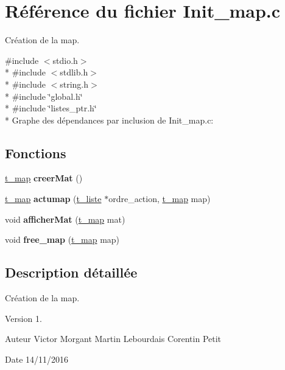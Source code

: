 \hypertarget{a00021}{}\section{Référence du fichier Init\+\_\+map.\+c}
\label{a00021}


Création de la map.  


{\ttfamily \#include $<$stdio.\+h$>$}\\*
{\ttfamily \#include $<$stdlib.\+h$>$}\\*
{\ttfamily \#include $<$string.\+h$>$}\\*
{\ttfamily \#include \char`\"{}global.\+h\char`\"{}}\\*
{\ttfamily \#include \char`\"{}listes\+\_\+ptr.\+h\char`\"{}}\\*
Graphe des dépendances par inclusion de Init\+\_\+map.\+c\+:
\subsection*{Fonctions}
\begin{DoxyCompactItemize}
\item 
\hyperlink{a00006}{t\+\_\+map} {\bfseries creer\+Mat} ()\hypertarget{a00021_aabb31eb0a9fed7b9013e4a396d92d8ae}{}\label{a00021_aabb31eb0a9fed7b9013e4a396d92d8ae}

\item 
\hyperlink{a00006}{t\+\_\+map} {\bfseries actumap} (\hyperlink{a00005}{t\+\_\+liste} $\ast$ordre\+\_\+action, \hyperlink{a00006}{t\+\_\+map} map)\hypertarget{a00021_aec2a5741ffb31e12f61b24165c7f68b4}{}\label{a00021_aec2a5741ffb31e12f61b24165c7f68b4}

\item 
void {\bfseries afficher\+Mat} (\hyperlink{a00006}{t\+\_\+map} mat)\hypertarget{a00021_a1280978369430f0c5e9696d4ef52517c}{}\label{a00021_a1280978369430f0c5e9696d4ef52517c}

\item 
void {\bfseries free\+\_\+map} (\hyperlink{a00006}{t\+\_\+map} map)\hypertarget{a00021_a37963b5f2d2efb0fa80a11ac2999be5c}{}\label{a00021_a37963b5f2d2efb0fa80a11ac2999be5c}

\end{DoxyCompactItemize}


\subsection{Description détaillée}
Création de la map. 

\begin{DoxyVersion}{Version}
1. 
\end{DoxyVersion}
\begin{DoxyAuthor}{Auteur}
Victor Morgant Martin Lebourdais Corentin Petit 
\end{DoxyAuthor}
\begin{DoxyDate}{Date}
14/11/2016 
\end{DoxyDate}
